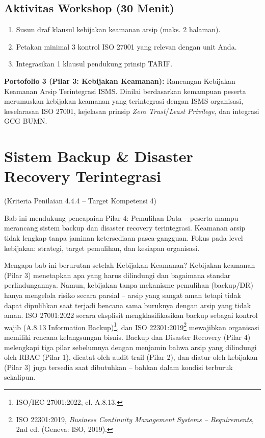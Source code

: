 \documentclass[12pt,a4paper]{report}
\begin{document}
\section{Aktivitas Workshop (30 Menit)}
\begin{enumerate}[leftmargin=*]
    \item Susun draf klausul kebijakan keamanan arsip (maks. 2 halaman).
    \item Petakan minimal 3 kontrol ISO 27001 yang relevan dengan unit Anda.
    \item Integrasikan 1 klausul pendukung prinsip TARIF.
\end{enumerate}

\begin{outputbox}
\textbf{Portofolio 3 (Pilar 3: Kebijakan Keamanan):} Rancangan Kebijakan Keamanan Arsip Terintegrasi ISMS. Dinilai berdasarkan kemampuan peserta merumuskan kebijakan keamanan yang terintegrasi dengan ISMS organisasi, keselarasan ISO 27001, kejelasan prinsip \textit{Zero Trust}/\textit{Least Privilege}, dan integrasi GCG BUMN.
\end{outputbox}

\chapter{Sistem Backup \& Disaster Recovery Terintegrasi}
(Kriteria Penilaian 4.4.4 -- Target Kompetensi 4)

Bab ini mendukung pencapaian Pilar 4: Pemulihan Data -- peserta mampu merancang sistem backup dan disaster recovery terintegrasi. Keamanan arsip tidak lengkap tanpa jaminan ketersediaan pasca-gangguan. Fokus pada level kebijakan: strategi, target pemulihan, dan kesiapan organisasi.

Mengapa bab ini berurutan setelah Kebijakan Keamanan? Kebijakan keamanan (Pilar 3) menetapkan apa yang harus dilindungi dan bagaimana standar perlindungannya. Namun, kebijakan tanpa mekanisme pemulihan (backup/DR) hanya mengelola risiko secara parsial -- arsip yang sangat aman tetapi tidak dapat dipulihkan saat terjadi bencana sama buruknya dengan arsip yang tidak aman. ISO 27001:2022 secara eksplisit mengklasifikasikan backup sebagai kontrol wajib (A.8.13 Information Backup)\footnote{ISO/IEC 27001:2022, cl. A.8.13.}, dan ISO 22301:2019\footnote{ISO 22301:2019, \textit{Business Continuity Management Systems -- Requirements}, 2nd ed. (Geneva: ISO, 2019).} mewajibkan organisasi memiliki rencana kelangsungan bisnis. Backup dan Disaster Recovery (Pilar 4) melengkapi tiga pilar sebelumnya dengan menjamin bahwa arsip yang dilindungi oleh RBAC (Pilar 1), dicatat oleh audit trail (Pilar 2), dan diatur oleh kebijakan (Pilar 3) juga tersedia saat dibutuhkan -- bahkan dalam kondisi terburuk sekalipun.
\end{document}
